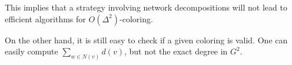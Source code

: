 \iffalse
\begin{proof}
Suppose there is one uncolored node that is a cut node of the graph, dividing the graph into two parts. 
Let $X$ ($Y$) be the set of colors of the d2-neighbors of the cut node on one (the other) side.
Give to Alice
Give to Alice (Bob) the colors of the neighbors of the cut node on one (the other) side, respectively.
Determining a valid color for the cut node is now equivalent to determining a color 
\end{proof}
\fi
This implies that a strategy involving network decompositions will not lead to efficient algorithms for $O(\Delta^2)$-coloring.


On the other hand, it is still easy to check if a given coloring is valid. One can easily compute $\sum_{w \in N(v)} d(v)$, but not the exact degree in $G^2$. 